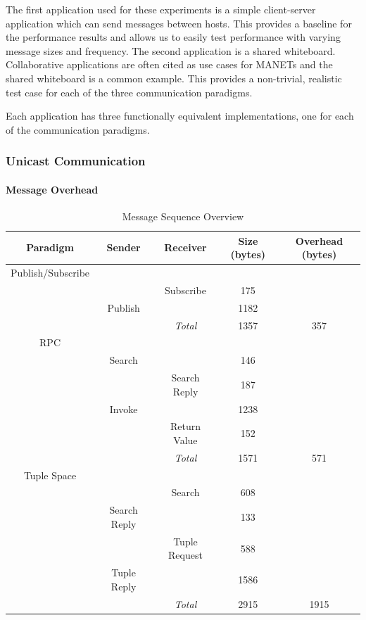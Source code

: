 The first application used for these experiments is a simple client-server application which can send messages between hosts. This provides a baseline for the performance results and allows us to easily test performance with varying message sizes and frequency. The second application is a shared whiteboard. Collaborative applications are often cited as use cases for MANETs and the shared whiteboard is a common example\cite{wb1, wb2, wb3, wb4}. This provides a non-trivial, realistic test case for each of the three communication paradigms. 

Each application has three functionally equivalent implementations, one for each of the communication paradigms.

\subsubsection{Unicast Communication}

\paragraph{Message Overhead}

\begin{table}
\centering
\caption{Message Sequence Overview}
\small
\begin{tabular}{|c|c|c|c|c|} \hline
Paradigm & Sender & Receiver & Size (bytes) & Overhead (bytes) \\ \hline
\rowcolor[gray]{.80}
Publish/Subscribe & & & & \\ \hline
& & Subscribe & 175 & \\
\rowcolor[gray]{.80}
& Publish & & 1182  & \\ \hline
& & \textit{Total} & 1357 & 357  \\ \hline
\rowcolor[gray]{.80}
RPC & & &  & \\ \hline
& Search & & 146 &  \\ 
\rowcolor[gray]{.80}
& & Search Reply & 187 &  \\
& Invoke & & 1238 & \\ 
\rowcolor[gray]{.80}
& & Return Value & 152 &  \\ \hline
& & \textit{Total} & 1571 & 571  \\ \hline
\rowcolor[gray]{.80}
Tuple Space & & &  & \\ \hline
& & Search & 608  & \\ 
\rowcolor[gray]{.80}
& Search Reply & & 133  & \\ 
& & Tuple Request & 588 &  \\ 
\rowcolor[gray]{.80}
& Tuple Reply & & 1586  & \\ \hline
& & \textit{Total} & 2915 & 1915  \\ \hline
\end{tabular}
\label{fig:messages}
\end{table}

